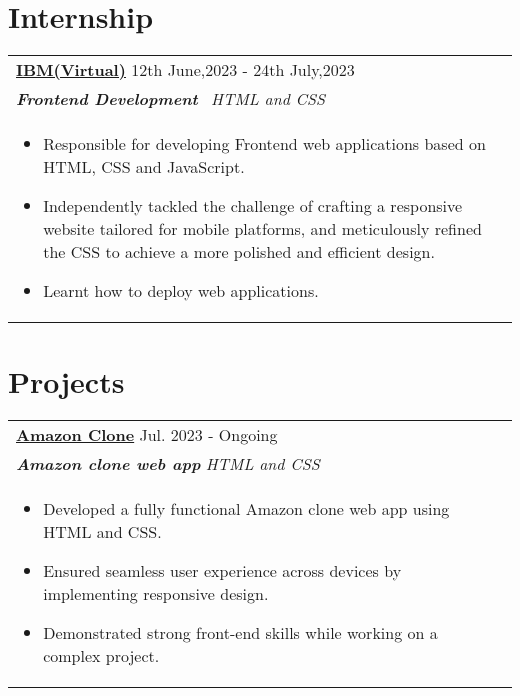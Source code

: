 \documentclass[a4paper,8pt]{article}
\begin{document}
\section{Internship}
\begin{tabularx}{\linewidth}{ @{}l r@{} }
\textbf{\uline{\href{https://adityaec2024.github.io/MyPortfolio/}{IBM(Virtual)}}} \hfill \color[HTML]{371e77} 12th June,2023  -  24th July,2023 \\[4pt]
\color[HTML]{371e77}\textbf{\textit{Frontend Development}}\ \hfill \color[HTML]{4B28A4} \textit{HTML and CSS} \\[5pt]
\begin{minipage}[t]{\linewidth}
    \begin{itemize}[nosep,after=\strut, leftmargin=2em, itemsep=2pt]
        \item Responsible for developing Frontend web applications based on HTML, CSS and JavaScript.
        \item Independently tackled the challenge of crafting a responsive 
  website tailored for mobile platforms, and meticulously refined the CSS to achieve a more polished and efficient design.
        \item Learnt how to deploy web applications.
    \end{itemize}
\end{minipage}
\end{tabularx}

\section{Projects}
\begin{tabularx}{\linewidth}{ @{}l r@{} }
\color[HTML]{1C033C} \textbf{\uline{{}{Amazon Clone}}} \hfill \color[HTML]{371e77} Jul. 2023 - Ongoing \\[4pt]
\color[HTML]{371e77}\textbf{\textit{ Amazon clone web app }} \hfill \color[HTML]{4B28A4} \textit{ HTML and CSS} \\[5pt]
\begin{minipage}[t]{\linewidth}
    \begin{itemize}[nosep,after=\strut, leftmargin=2em, itemsep=2pt]
        \item Developed a fully functional Amazon clone web app using HTML and CSS.
        \item Ensured seamless user experience across devices by implementing responsive design.
        \item Demonstrated strong front-end skills while working on a complex project.
    \end{itemize}
    \end{minipage}
\end{tabularx}
\end{document}
